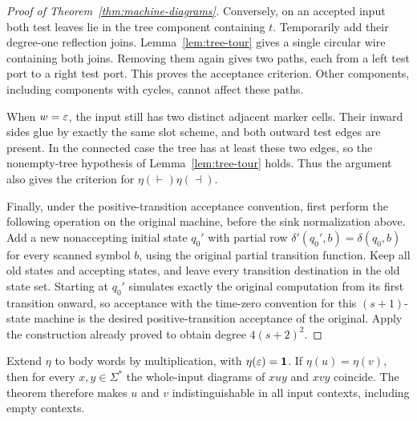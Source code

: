 \begin{proof}[Proof of Theorem~\ref{thm:machine-diagrams}]
Conversely, on an accepted input both test leaves lie in the tree
component containing $t$.  Temporarily add their degree-one
reflection joins.  Lemma~\ref{lem:tree-tour} gives a single circular
wire containing both joins.  Removing them again gives two paths,
each from a left test port to a right test port.  This proves the
acceptance criterion.  Other components, including components with
cycles, cannot affect these paths.

When $w=\varepsilon$, the input still has two distinct adjacent marker
cells.  Their inward sides glue by exactly the same slot scheme,
and both outward test edges are present.  In the connected case the
tree has at least these two edges, so the nonempty-tree hypothesis
of Lemma~\ref{lem:tree-tour} holds.  Thus the argument also gives the
criterion for $\eta(\vdash)\eta(\dashv)$.

Finally, under the positive-transition acceptance convention, first
perform the following operation on the original machine, before the
sink normalization above.  Add a new nonaccepting initial state $q_0'$
with partial row $\delta'(q_0',b)=\delta(q_0,b)$ for every scanned
symbol $b$, using the original partial transition function.
Keep all old states and accepting
states, and leave every transition destination in the old state
set.  Starting at $q_0'$ simulates exactly the original computation
from its first transition onward, so acceptance with the time-zero
convention for this $(s+1)$-state machine is the desired
positive-transition acceptance of the original.  Apply the
construction already proved to obtain degree $4(s+2)^2$.
\end{proof}

Extend $\eta$ to body words by multiplication, with
$\eta(\varepsilon)=\mathbf 1$.  If $\eta(u)=\eta(v)$, then for every
$x,y\in\Sigma^*$ the whole-input diagrams of $xuy$ and $xvy$
coincide.  The theorem therefore makes $u$ and $v$
indistinguishable in all input contexts, including empty contexts.
